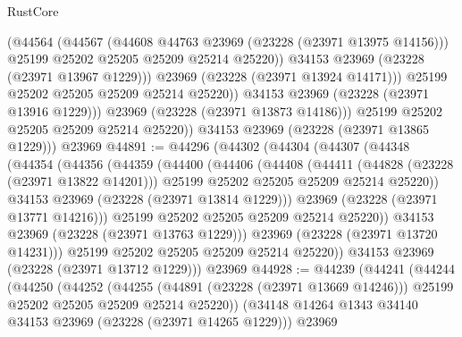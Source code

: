 \begin{lexlean}{RustCore}
\begin{coremodule}
                      (@44564
                        (@44567
                          (@44608 @44763 @23969 (@23228 (@23971 @13975 @14156)))
                          @25199
                          @25202
                          @25205
                          @25209
                          @25214
                          @25220))
                      @34153
                      @23969
                      (@23228 (@23971 @13967 @1229)))
                    @23969
                    (@23228 (@23971 @13924 @14171)))
                  @25199
                  @25202
                  @25205
                  @25209
                  @25214
                  @25220))
              @34153
              @23969
              (@23228 (@23971 @13916 @1229)))
            @23969
            (@23228 (@23971 @13873 @14186)))
          @25199
          @25202
          @25205
          @25209
          @25214
          @25220))
      @34153
      @23969
      (@23228 (@23971 @13865 @1229)))
    @23969
@44891 := @44296
    (@44302
      (@44304
        (@44307
          (@44348
            (@44354
              (@44356
                (@44359
                  (@44400
                    (@44406
                      (@44408
                        (@44411
                          (@44828 (@23228 (@23971 @13822 @14201)))
                          @25199
                          @25202
                          @25205
                          @25209
                          @25214
                          @25220))
                      @34153
                      @23969
                      (@23228 (@23971 @13814 @1229)))
                    @23969
                    (@23228 (@23971 @13771 @14216)))
                  @25199
                  @25202
                  @25205
                  @25209
                  @25214
                  @25220))
              @34153
              @23969
              (@23228 (@23971 @13763 @1229)))
            @23969
            (@23228 (@23971 @13720 @14231)))
          @25199
          @25202
          @25205
          @25209
          @25214
          @25220))
      @34153
      @23969
      (@23228 (@23971 @13712 @1229)))
    @23969
@44928 := @44239
    (@44241
      (@44244
        (@44250
          (@44252
            (@44255
              (@44891 (@23228 (@23971 @13669 @14246)))
              @25199
              @25202
              @25205
              @25209
              @25214
              @25220))
          (@34148 @14264 @1343 @34140 @34153 @23969 (@23228 (@23971 @14265 @1229)))
          @23969

\end{coremodule}
\end{lexlean}
